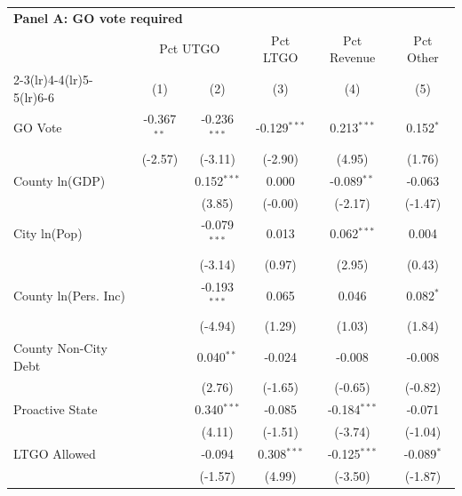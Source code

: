 \begingroup
\centering
\begin{tabular*}{\textwidth}{@{\extracolsep{\fill}}lccccc}
\multicolumn{5}{l}{\textbf{Panel A: GO vote required}}\\

\addlinespace
   \toprule
    & \multicolumn{2}{c}{Pct UTGO} & Pct LTGO & Pct Revenue & Pct Other\\
   \cmidrule(lr){2-3}\cmidrule(lr){4-4}\cmidrule(lr){5-5}\cmidrule(lr){6-6}
                        & (1)           & (2)            & (3)            & (4)            & (5)\\  
   \midrule 
   GO Vote              & -0.367$^{**}$ & -0.236$^{***}$ & -0.129$^{***}$ & 0.213$^{***}$  & 0.152$^{*}$\\   
                        & (-2.57)      & (-3.11)       & (-2.90)       & (4.95)        & (1.76)\\   
   County ln(GDP)       &               & 0.152$^{***}$  & 0.000          & -0.089$^{**}$  & -0.063\\   
                        &               & (3.85)        & (-0.00)       & (-2.17)       & (-1.47)\\   
   City ln(Pop)         &               & -0.079$^{***}$ & 0.013          & 0.062$^{***}$  & 0.004\\   
                        &               & (-3.14)       & (0.97)        & (2.95)        & (0.43)\\   
   County ln(Pers. Inc) &               & -0.193$^{***}$ & 0.065          & 0.046          & 0.082$^{*}$\\   
                        &               & (-4.94)       & (1.29)        & (1.03)        & (1.84)\\   
   County Non-City Debt &               & 0.040$^{**}$   & -0.024         & -0.008         & -0.008\\   
                        &               & (2.76)        & (-1.65)       & (-0.65)       & (-0.82)\\   
   Proactive State      &               & 0.340$^{***}$  & -0.085         & -0.184$^{***}$ & -0.071\\   
                        &               & (4.11)        & (-1.51)       & (-3.74)       & (-1.04)\\   
   LTGO Allowed         &               & -0.094         & 0.308$^{***}$  & -0.125$^{***}$ & -0.089$^{*}$\\   
                        &               & (-1.57)       & (4.99)        & (-3.50)       & (-1.87)\\   

\end{tabular*}
